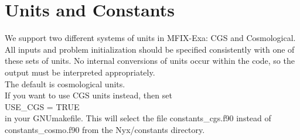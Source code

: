 \section{Units and Constants}

We support two different systems of units in MFIX-Exa: CGS and Cosmological.
All inputs and problem initialization should be specified consistently with one of these sets of units.  
No internal conversions of units occur within the code, so the output must be interpreted appropriately. \\

\noindent The default is cosmological units. \\

\noindent If you want to use CGS units instead, then set \\

\noindent USE\_CGS = TRUE  \\

\noindent in your GNUmakefile.  This will select the file constants\_cgs.f90 instead of constants\_cosmo.f90 from the
Nyx/constants directory. 

